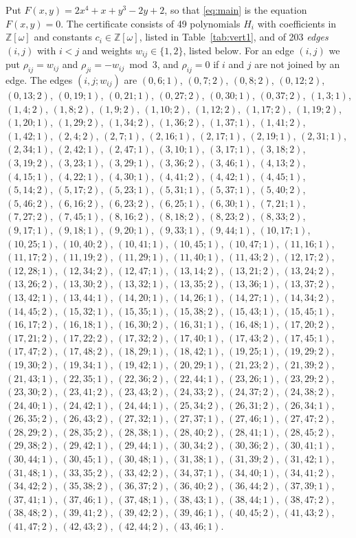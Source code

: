 \documentclass[11pt]{article}
\newcommand{\Z}{\mathbb{Z}}
\begin{document}
Put $F(x,y)=2x^{4}+x+y^{3}-2y+2$, so that \eqref{eq:main} is the equation $F(x,y)=0$. The certificate consists of 49 polynomials $H_i$ with coefficients in $\Z[\omega]$ and constants $c_i\in\Z[\omega]$, listed in Table~\ref{tab:vert1}, and of 203 \emph{edges} $(i,j)$ with $i<j$ and weights $w_{ij}\in\{1,2\}$, listed below. For an edge $(i,j)$ we put $\rho_{ij}=w_{ij}$ and $\rho_{ji}=-w_{ij}\bmod 3$, and $\rho_{ij}=0$ if $i$ and $j$ are not joined by an edge.
The edges $(i,j;w_{ij})$ are $(0,6;1)$, $(0,7;2)$, $(0,8;2)$, $(0,12;2)$, $(0,13;2)$, $(0,19;1)$, $(0,21;1)$, $(0,27;2)$, $(0,30;1)$, $(0,37;2)$, $(1,3;1)$, $(1,4;2)$, $(1,8;2)$, $(1,9;2)$, $(1,10;2)$, $(1,12;2)$, $(1,17;2)$, $(1,19;2)$, $(1,20;1)$, $(1,29;2)$, $(1,34;2)$, $(1,36;2)$, $(1,37;1)$, $(1,41;2)$, $(1,42;1)$, $(2,4;2)$, $(2,7;1)$, $(2,16;1)$, $(2,17;1)$, $(2,19;1)$, $(2,31;1)$, $(2,34;1)$, $(2,42;1)$, $(2,47;1)$, $(3,10;1)$, $(3,17;1)$, $(3,18;2)$, $(3,19;2)$, $(3,23;1)$, $(3,29;1)$, $(3,36;2)$, $(3,46;1)$, $(4,13;2)$, $(4,15;1)$, $(4,22;1)$, $(4,30;1)$, $(4,41;2)$, $(4,42;1)$, $(4,45;1)$, $(5,14;2)$, $(5,17;2)$, $(5,23;1)$, $(5,31;1)$, $(5,37;1)$, $(5,40;2)$, $(5,46;2)$, $(6,16;2)$, $(6,23;2)$, $(6,25;1)$, $(6,30;1)$, $(7,21;1)$, $(7,27;2)$, $(7,45;1)$, $(8,16;2)$, $(8,18;2)$, $(8,23;2)$, $(8,33;2)$, $(9,17;1)$, $(9,18;1)$, $(9,20;1)$, $(9,33;1)$, $(9,44;1)$, $(10,17;1)$, $(10,25;1)$, $(10,40;2)$, $(10,41;1)$, $(10,45;1)$, $(10,47;1)$, $(11,16;1)$, $(11,17;2)$, $(11,19;2)$, $(11,29;1)$, $(11,40;1)$, $(11,43;2)$, $(12,17;2)$, $(12,28;1)$, $(12,34;2)$, $(12,47;1)$, $(13,14;2)$, $(13,21;2)$, $(13,24;2)$, $(13,26;2)$, $(13,30;2)$, $(13,32;1)$, $(13,35;2)$, $(13,36;1)$, $(13,37;2)$, $(13,42;1)$, $(13,44;1)$, $(14,20;1)$, $(14,26;1)$, $(14,27;1)$, $(14,34;2)$, $(14,45;2)$, $(15,32;1)$, $(15,35;1)$, $(15,38;2)$, $(15,43;1)$, $(15,45;1)$, $(16,17;2)$, $(16,18;1)$, $(16,30;2)$, $(16,31;1)$, $(16,48;1)$, $(17,20;2)$, $(17,21;2)$, $(17,22;2)$, $(17,32;2)$, $(17,40;1)$, $(17,43;2)$, $(17,45;1)$, $(17,47;2)$, $(17,48;2)$, $(18,29;1)$, $(18,42;1)$, $(19,25;1)$, $(19,29;2)$, $(19,30;2)$, $(19,34;1)$, $(19,42;1)$, $(20,29;1)$, $(21,23;2)$, $(21,39;2)$, $(21,43;1)$, $(22,35;1)$, $(22,36;2)$, $(22,44;1)$, $(23,26;1)$, $(23,29;2)$, $(23,30;2)$, $(23,41;2)$, $(23,43;2)$, $(24,33;2)$, $(24,37;2)$, $(24,38;2)$, $(24,40;1)$, $(24,42;1)$, $(24,44;1)$, $(25,34;2)$, $(26,31;2)$, $(26,34;1)$, $(26,35;2)$, $(26,43;2)$, $(27,32;1)$, $(27,37;1)$, $(27,46;1)$, $(27,47;2)$, $(28,29;2)$, $(28,35;2)$, $(28,38;1)$, $(28,40;2)$, $(28,41;1)$, $(28,45;2)$, $(29,38;2)$, $(29,42;1)$, $(29,44;1)$, $(30,34;2)$, $(30,36;2)$, $(30,41;1)$, $(30,44;1)$, $(30,45;1)$, $(30,48;1)$, $(31,38;1)$, $(31,39;2)$, $(31,42;1)$, $(31,48;1)$, $(33,35;2)$, $(33,42;2)$, $(34,37;1)$, $(34,40;1)$, $(34,41;2)$, $(34,42;2)$, $(35,38;2)$, $(36,37;2)$, $(36,40;2)$, $(36,44;2)$, $(37,39;1)$, $(37,41;1)$, $(37,46;1)$, $(37,48;1)$, $(38,43;1)$, $(38,44;1)$, $(38,47;2)$, $(38,48;2)$, $(39,41;2)$, $(39,42;2)$, $(39,46;1)$, $(40,45;2)$, $(41,43;2)$, $(41,47;2)$, $(42,43;2)$, $(42,44;2)$, $(43,46;1)$.
\end{document}
